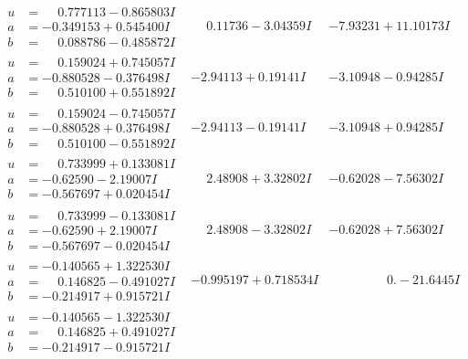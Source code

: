 \documentclass[1p]{elsarticle_modified}
\theoremstyle{definition}
\begin{document}
$$\begin{array}{c|c|c}
\begin{aligned}
u &= \phantom{-}0.777113 - 0.865803 I \\
a &= -0.349153 + 0.545400 I \\
b &= \phantom{-}0.088786 - 0.485872 I\end{aligned}
 & \phantom{-}0.11736 - 3.04359 I & -7.93231 + 11.10173 I \\ \hline\begin{aligned}
u &= \phantom{-}0.159024 + 0.745057 I \\
a &= -0.880528 - 0.376498 I \\
b &= \phantom{-}0.510100 + 0.551892 I\end{aligned}
 & -2.94113 + 0.19141 I & -3.10948 - 0.94285 I \\ \hline\begin{aligned}
u &= \phantom{-}0.159024 - 0.745057 I \\
a &= -0.880528 + 0.376498 I \\
b &= \phantom{-}0.510100 - 0.551892 I\end{aligned}
 & -2.94113 - 0.19141 I & -3.10948 + 0.94285 I \\ \hline\begin{aligned}
u &= \phantom{-}0.733999 + 0.133081 I \\
a &= -0.62590 - 2.19007 I \\
b &= -0.567697 + 0.020454 I\end{aligned}
 & \phantom{-}2.48908 + 3.32802 I & -0.62028 - 7.56302 I \\ \hline\begin{aligned}
u &= \phantom{-}0.733999 - 0.133081 I \\
a &= -0.62590 + 2.19007 I \\
b &= -0.567697 - 0.020454 I\end{aligned}
 & \phantom{-}2.48908 - 3.32802 I & -0.62028 + 7.56302 I \\ \hline\begin{aligned}
u &= -0.140565 + 1.322530 I \\
a &= \phantom{-}0.146825 - 0.491027 I \\
b &= -0.214917 + 0.915721 I\end{aligned}
 & -0.995197 + 0.718534 I & \phantom{-0.000000 } 0. - 21.6445 I \\ \hline\begin{aligned}
u &= -0.140565 - 1.322530 I \\
a &= \phantom{-}0.146825 + 0.491027 I \\
b &= -0.214917 - 0.915721 I\end{aligned}

\end{array}$$
\end{document}
